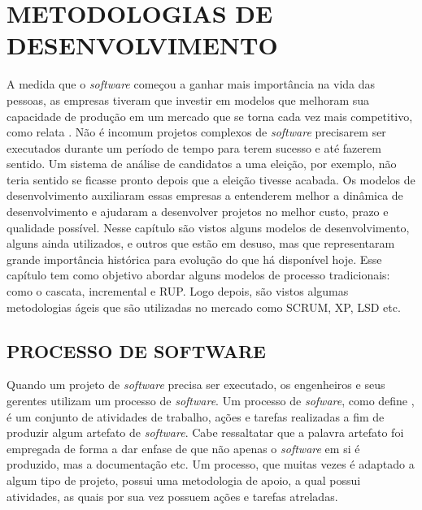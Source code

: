 \chapter{METODOLOGIAS DE DESENVOLVIMENTO}
\label{cap:02}

A medida que o \textit{software} começou a ganhar mais importância na vida das pessoas, as empresas tiveram que investir em modelos que melhoram sua capacidade de produção em um mercado que se torna cada vez mais competitivo, como relata . Não é incomum projetos complexos de \textit{software} precisarem ser executados durante um período de tempo para terem sucesso e até fazerem sentido. Um sistema de análise de candidatos a uma eleição, por exemplo, não teria sentido se ficasse pronto depois que a eleição tivesse acabada. Os modelos de desenvolvimento auxiliaram essas empresas a entenderem melhor a dinâmica de desenvolvimento e ajudaram a desenvolver projetos no melhor custo, prazo e qualidade possível. Nesse capítulo são vistos alguns modelos de desenvolvimento, alguns ainda utilizados, e outros que estão em desuso, mas que representaram grande importância histórica para evolução do que há disponível hoje. Esse capítulo tem como objetivo abordar alguns modelos de processo tradicionais: como o cascata, incremental e RUP. Logo depois, são vistos algumas metodologias ágeis que são utilizadas no mercado como SCRUM, XP, LSD etc. 

\section{PROCESSO DE SOFTWARE}

Quando um projeto de \textit{software} precisa ser executado, os engenheiros e seus gerentes utilizam um processo de \textit{software}. Um processo de \textit{sofware}, como define , é um conjunto de atividades de trabalho, ações e tarefas realizadas a fim de produzir algum artefato de \textit{software}. Cabe ressaltatar que a palavra artefato foi empregada de forma a dar enfase de que não apenas o \textit{software} em si é produzido, mas a documentação etc. Um processo, que muitas vezes é adaptado a algum tipo de projeto, possui uma metodologia de apoio, a qual possui atividades, as quais por sua vez possuem ações e tarefas atreladas.

